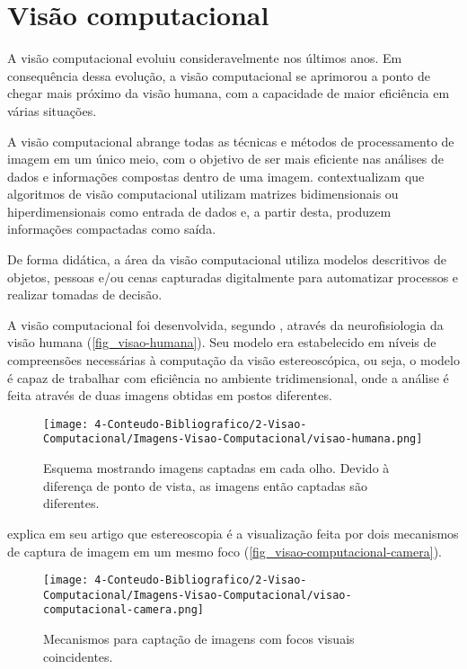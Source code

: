 \section{\textbf{{Visão computacional}}}
\label{visao-computacional}

A visão computacional evoluiu consideravelmente nos últimos anos. Em consequência dessa evolução, a visão computacional se aprimorou a ponto de chegar mais próximo da visão humana, com a capacidade de maior eficiência em várias situações.

A visão computacional abrange todas as técnicas e métodos de processamento de imagem em um único meio, com o objetivo de ser mais eficiente nas análises de dados e informações compostas dentro de uma imagem.  contextualizam que algoritmos de visão computacional utilizam matrizes bidimensionais ou hiperdimensionais como entrada de dados e, a partir desta, produzem informações compactadas como saída.

De forma didática, a área da visão computacional utiliza modelos descritivos de objetos, pessoas e/ou cenas capturadas digitalmente para automatizar processos e realizar tomadas de decisão.

A visão computacional foi desenvolvida, segundo , através da neurofisiologia da visão humana (\autoref{fig_visao-humana}). Seu modelo era estabelecido em níveis de compreensões necessárias à computação da visão estereoscópica, ou seja, o modelo é capaz de trabalhar com eficiência no ambiente tridimensional, onde a análise é feita através de duas imagens obtidas em postos diferentes.

\begin{figure}[h]
	\caption{\label{fig_visao-humana}Esquema mostrando imagens captadas em cada olho. Devido à diferença de
ponto de vista, as imagens então captadas são diferentes.}
	\begin{center}
		\texttt{[image: 4-Conteudo-Bibliografico/2-Visao-Computacional/Imagens-Visao-Computacional/visao-humana.png]}
	\end{center}
	\centering {}
\end{figure}

 explica em seu artigo que estereoscopia é a visualização feita por dois mecanismos de captura de imagem em um mesmo foco (\autoref{fig_visao-computacional-camera}).

\begin{figure}[ht]
	\caption{\label{fig_visao-computacional-camera}Mecanismos para captação de imagens com focos visuais coincidentes.}
	\begin{center}
		\texttt{[image: 4-Conteudo-Bibliografico/2-Visao-Computacional/Imagens-Visao-Computacional/visao-computacional-camera.png]}
	\end{center}
	\centering {}
\end{figure}

